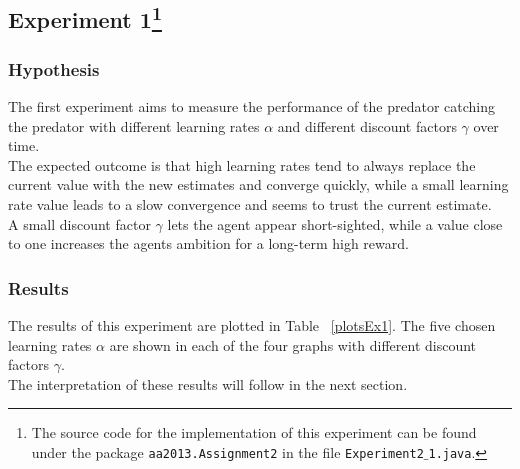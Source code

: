 \documentclass[11pt]{article}
\begin{document}

\subsection[title] {Experiment 1\footnote{The source code for the implementation of this experiment can be found under the package \texttt{aa2013.Assignment2} in the file \texttt{Experiment2$\_$1.java}.}}


\subsubsection{Hypothesis}
The first experiment aims to measure the performance of the predator catching the predator with different learning rates $\alpha$ and different discount factors $\gamma$ over time.\\
The expected outcome is that high learning rates tend to always replace the current value with the new estimates and converge quickly, while a small learning rate value leads to a slow convergence and seems to trust the current estimate. ~\cite{dar}\\
A small discount factor $\gamma$ lets the agent appear short-sighted, while a value close to one increases the agents ambition for a long-term high reward.

\subsubsection{Results}
The results of this experiment are plotted in Table ~\ref{plotsEx1}. The five chosen learning rates $\alpha$ are shown in each of the four graphs with different discount factors $\gamma$.\\
The interpretation of these results will follow in the next section.
\end{document}
